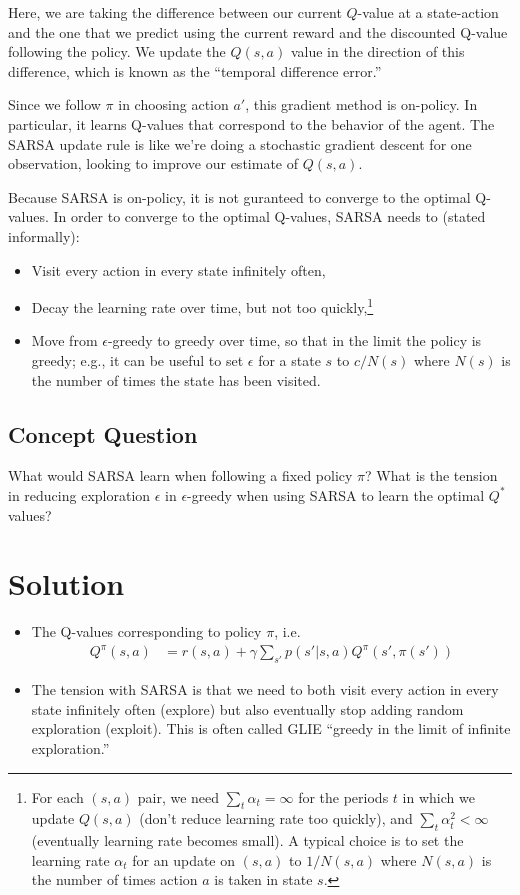\documentclass[11pt, letterpaper]{article}
\newenvironment{solution}
  {\color{blue}\section*{Solution}}
{}
\begin{document}
Here, we are taking the difference between our current $Q$-value at a
state-action and the one that we predict using the current reward and the
discounted Q-value following the policy. We update the $Q(s,a)$ value
in the direction of this difference, which is known as the ``temporal
difference error.''

Since we follow $\pi$ in choosing action $a'$, this gradient method is
on-policy. In particular, it learns Q-values that correspond to the
behavior of the agent. The SARSA update rule is like we're doing a
stochastic gradient descent for one observation, looking to improve
our estimate of $Q(s,a)$.

Because SARSA is on-policy, it is not guranteed to converge to the
optimal Q-values. In order to converge to the optimal Q-values, SARSA
needs to (stated informally):
%
\begin{itemize}
\item Visit every action in every state infinitely often,
\item Decay the learning rate over time, but not too
             quickly,\footnote{For each $(s,a)$ pair, we need
             $\sum_t \alpha_t=\infty$ for the periods $t$ in which we
             update $Q(s,a)$ (don't reduce learning rate too quickly),
             and $\sum_t\alpha_t^2<\infty$ (eventually learning rate
             becomes small). A typical choice is to set the  learning rate
    $\alpha_t$ for an update on $(s,a)$  to $1/N(s,a)$ where
    $N(s,a)$ is the number of times action $a$ is taken in state $s$.}
    \item Move from $\epsilon$-greedy to greedy over time, so that in
      the limit the policy is greedy; e.g., it can be useful to set
      $\epsilon$ for a state $s$ to $c/N(s)$ where $N(s)$ is the
      number of times the state has been visited.
      \end{itemize}


      \subsection{Concept Question}

      What would SARSA learn when following a fixed policy $\pi$? What
      is the tension in reducing exploration $\epsilon$ in
      $\epsilon$-greedy when using SARSA to learn the optimal $Q^*$ values?

\begin{solution}
      \begin{itemize}
      \item  The Q-values corresponding to policy $\pi$, i.e.
          \begin{align}
           Q^\pi(s,a)&=r(s,a)+\gamma\sum_{s'}p(s'|s,a)Q^\pi(s',\pi(s'))
        \end{align}
      \item The tension with SARSA  is that we need to both visit every
          action in every state infinitely often (explore) but also
          eventually stop adding random exploration (exploit). This is
        often called GLIE ``greedy in the limit of infinite exploration.''
      \end{itemize}
\end{solution}
\end{document}
